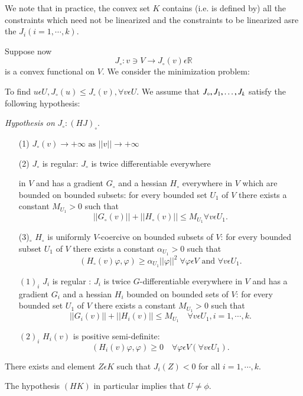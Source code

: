 We note that in practice, the convex set $K$ contains (i.e. is defined by) all the constraints which need not be linearized and the constraints to be linearized asre the $J_{i}(i = 1, \cdots, k)$.

Suppose now
$$
J_{\circ} : v \ni V \to J_{\circ}(v) \epsilon \mathbb{R}
$$
is a convex functional on $V$. We consider the minimization problem:

\begin{problem}\label{chap4-prob1.1}
To find $u \epsilon U, J_{\circ}(u) \leq J_{\circ}(v), \forall v
\epsilon U$. We assume that $J_{\circ}, J_{1},\break \ldots, J_{k}$ satisfy
the following hypothesis: 


{\em Hypothesis on} $J_{\circ} : (HJ)_{\circ}$.  
\begin{enumerate}
\item[(1)] $J_{\circ}(v) \to + \infty \text{ as } ||v|| \to + \infty$

\item[(2)] $J_{\circ}$  is regular:  $J_{\circ}$  is twice differentiable everywhere 

in $V$ and has a gradient $G_{\circ}$ and a hessian $H_{\circ}$ everywhere in $V$ which are bounded on bounded subsets: for every bounded set $U_{1}$ of $V$ there exists a constant $M_{U_{1}} > 0$ such that
$$
||G_{\circ}(v)|| + ||H_{\circ} (v)|| \leq M_{U_{1}} \forall v \epsilon U_{1}.
$$

\item[(3)$_{\circ}$] $H_{\circ}$ is uniformly $V$-coercive on bounded subsets of $V$: for every bounded subset $U_{1}$ of $V$ there exists a constant $\alpha_{U_{1}} > 0$ such that
$$
(H_{\circ}(v) \varphi, \varphi) \geq \alpha_{U_{1}} ||\varphi||^{2} \; \forall \varphi \epsilon V \text{ and } \forall v \epsilon U_{1}.
$$
\end{enumerate}\pageoriginale

\begin{enumerate}
\item[$(1)_{i}$] $J_{i}$ is regular : $J_{i}$ is twice $G$-differentiable everywhere in $V$ and has a gradient $G_{i}$ and a hessian $H_{i}$ bounded on bounded sets of $V$: for every bounded set $U_{1}$ of $V$ there exists a constant $M_{U_{1}} > 0$ such that
$$
||G_{i}(v)|| + ||H_{i}(v)|| \leq M_{U_{1}} \quad \forall v \epsilon U_{1}, i=1, \cdots , k.
$$

\item[$(2)_{i}$] $H_{i}(v)$ is positive semi-definite:
$$
(H_{i}(v) \varphi, \varphi) \geq 0 \quad \forall \varphi \epsilon V (\forall v \epsilon U_{1}).
$$ 
\end{enumerate}

 There exists and element $Z \epsilon K$ such that $J_{i} (Z) < 0$ for all $i = 1, \cdots, k$.

The hypothesis $(HK)$ in particular implies that $U \neq \phi$.
\end{problem}

